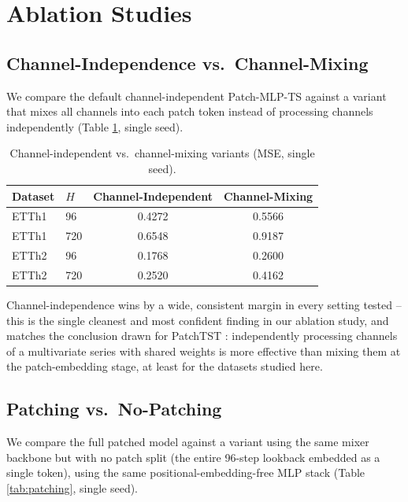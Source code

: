 \documentclass[conference]{IEEEtran}
\begin{document}
\section{Ablation Studies}
\label{sec:ablation}

\subsection{Channel-Independence vs.\ Channel-Mixing}

We compare the default channel-independent Patch-MLP-TS against a variant that
mixes all channels into each patch token instead of processing channels
independently (Table \ref{tab:channelmix}, single seed).

\begin{table}[h]
\caption{Channel-independent vs.\ channel-mixing variants (MSE, single seed).}
\label{tab:channelmix}
\centering
\small
\begin{tabular}{llcc}
\toprule
Dataset & $H$ & Channel-Independent & Channel-Mixing \\
\midrule
ETTh1 & 96  & 0.4272 & 0.5566 \\
ETTh1 & 720 & 0.6548 & 0.9187 \\
ETTh2 & 96  & 0.1768 & 0.2600 \\
ETTh2 & 720 & 0.2520 & 0.4162 \\
\bottomrule
\end{tabular}
\end{table}

Channel-independence wins by a wide, consistent margin in every setting tested --
this is the single cleanest and most confident finding in our ablation study, and
matches the conclusion drawn for PatchTST \cite{nie2023patchtst}: independently
processing channels of a multivariate series with shared weights is more effective
than mixing them at the patch-embedding stage, at least for the datasets studied
here.

\subsection{Patching vs.\ No-Patching}

We compare the full patched model against a variant using the same mixer backbone
but with no patch split (the entire 96-step lookback embedded as a single token),
using the same positional-embedding-free MLP stack (Table \ref{tab:patching},
single seed).
\end{document}
